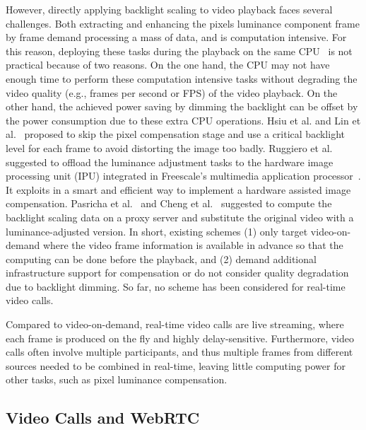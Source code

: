 However, directly applying backlight scaling to video playback faces
several challenges. Both extracting and enhancing the pixels luminance
component frame by frame demand processing a mass of data, and is
computation intensive.  For this reason, deploying these tasks during
the playback on the same CPU~\cite{CHP07, CSC02} is not practical
because of two reasons.  On the one hand, the CPU may not have enough
time to perform these computation intensive tasks without degrading
the video quality (e.g., frames per second or FPS) of the video
playback. On the other hand, the achieved power saving by dimming the
backlight can be offset by the power consumption due to these extra
CPU operations. Hsiu et al. and Lin et al.~\cite{LHH14, HLH11}
proposed to skip the pixel compensation stage and use a critical
backlight level for each frame to avoid distorting the image too
badly. Ruggiero et al. suggested to offload the luminance adjustment
tasks to the hardware image processing unit (IPU) integrated in
Freescale’s multimedia application processor~\cite{RBB08}. It exploits
in a smart and efficient way to implement a hardware assisted image
compensation.  Pasricha et al.~\cite{PMLDV03} and Cheng et
al.~\cite{CMEDV07} suggested to compute the backlight scaling data on
a proxy server and substitute the original video with a
luminance-adjusted version. In short, existing schemes (1) only target
video-on-demand where the video frame information is available in
advance so that the computing can be done before the playback, and (2)
demand additional infrastructure support for compensation or do not
consider quality degradation due to backlight dimming. So far, no
scheme has been considered for real-time video calls.

Compared to video-on-demand, real-time video calls are live streaming,
where each frame is produced on the fly and highly
delay-sensitive. Furthermore, video calls often involve multiple
participants, and thus multiple frames from different sources needed
to be combined in real-time, leaving little computing power for other
tasks, such as pixel luminance compensation.

\subsection{Video Calls and WebRTC}

